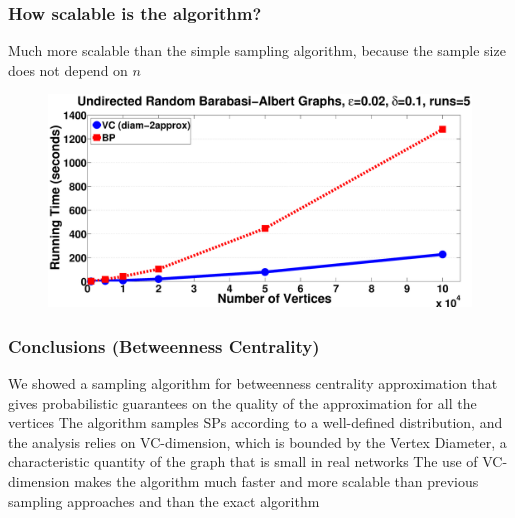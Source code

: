 \documentclass[aspectratio=169]{beamer}
\begin{document}
\begin{frame}
  \frametitle{How scalable is the algorithm?}
  Much more scalable than the simple sampling algorithm, because the sample
  size does not depend on $n$
  \vfill
  \begin{figure}[H]
    \centering
    \includegraphics[scale=0.22]{figs/random-time}
  \end{figure}
\end{frame}

\begin{frame}
  \frametitle{Conclusions (Betweenness Centrality)}
  \vfill
  We showed a sampling algorithm for betweenness centrality approximation that
  gives probabilistic guarantees on the quality of the approximation for all
  the vertices
  \vfill
  The algorithm samples SPs according to a well-defined distribution, and
  the analysis relies on VC-dimension, which is bounded by the Vertex Diameter,
  a characteristic quantity of the graph that is small in real networks
  \vfill
  The use of VC-dimension makes the algorithm much faster and more scalable
  than previous sampling approaches and than the exact algorithm
\end{frame}


\end{document}
